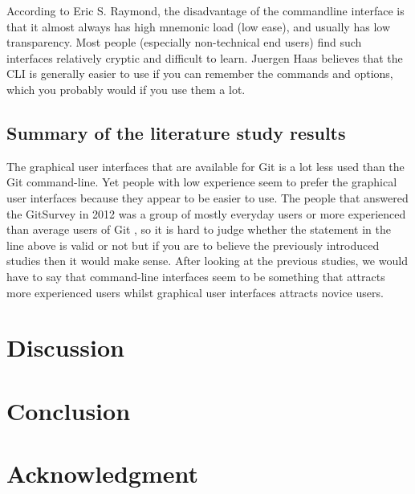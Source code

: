 \documentclass[12pt,a4paper,article,compsoc]{IEEEtran}
\begin{document}
			According to Eric S. Raymond, the disadvantage of the commandline interface is that it almost always has high mnemonic load (low ease), and usually has low transparency. Most people (especially non-technical end users) find such interfaces relatively cryptic and difficult to learn. \cite{ArtOfUnixProgramming}
			Juergen Haas believes that the CLI is generally easier to use if you can remember the commands and options, which you probably would if you use them a lot. \cite{LinuxGuiVsCli}
			
			
			\subsection{Summary of the literature study results}
			The graphical user interfaces that are available for Git is a lot less used than the Git command-line. Yet people with low experience seem to prefer the graphical user interfaces because they appear to be easier to use. The people that answered the GitSurvey in 2012 was a group of mostly everyday users or more experienced than average users of Git \cite{GitUserSurvey}, so it is hard to judge whether the statement in the line above is valid or not but if you are to believe the previously introduced studies then it would make sense. After looking at the previous studies, we would have to say that command-line interfaces seem to be something that attracts more experienced users whilst graphical user interfaces attracts novice users.
		
		\section{Discussion}
		
		\section{Conclusion}
			
		
		\section*{Acknowledgment}
		
\end{document}
